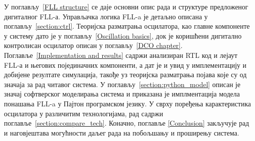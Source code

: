 \documentclass[master]{finthesis}
\def \FLL  {FLL} %
\begin{document}
У поглављу~\ref{FLL structure} се даје основни опис рада и структуре предложеног дигиталног \FLL-а. Управљачка логика \FLL-a је детаљно описана у поглављу~\ref{section:ctrl}. Теоријска разматрања осцилатора, као главне компоненте у систему дато је у поглављу~\ref{Oscillation basics}, док је коришћени дигитално контролисан осцилатор описан у поглављу~\ref{DCO chapter}. Поглавље~\ref{Implementation and results} садржи анализиран RTL код и лејаут \FLL-а и његових појединачних компоненти, а дат је и увид у имплементацију и добијене резултате симулација, такође уз теоријска разматрања појава које су од значаја за рад читавог система. У поглављу~\ref{section:python_model} описан је значај софтверског моделирања система и приказана је имплментација модела понашања \FLL-a у Пајтон програмском језику. У сврху поређења карактеристика осцилатора у различитим технологијама, рад садржи поглавље~\ref{section:compare_tech}. Коначно, поглавље \ref{Conclusion} закључује рад и наговјештава могућности даљег рада на побољшању и проширењу система.
\end{document}
